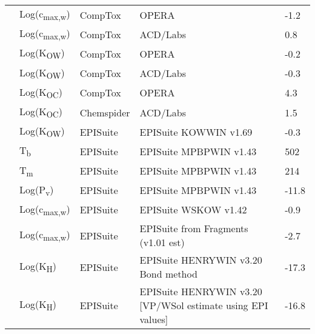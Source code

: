 \begin{landscape}
\begin{longtable}[c]{lllll}
          & Log(c\textsubscript{max,w}) & CompTox    & OPERA                                                                           & -1.2  \\
          & Log(c\textsubscript{max,w}) & CompTox    & ACD/Labs                                                                        & 0.8   \\
          & Log(K\textsubscript{OW})      & CompTox    & OPERA                                                                           & -0.2  \\
          & Log(K\textsubscript{OW})      & CompTox    & ACD/Labs                                                                        & -0.3  \\
          & Log(K\textsubscript{OC})      & CompTox    & OPERA                                                                           & 4.3   \\
          & Log(K\textsubscript{OC})      & Chemspider & ACD/Labs                                                                        & 1.5   \\
          & Log(K\textsubscript{OW})      & EPISuite   & EPISuite KOWWIN v1.69                                                           & -0.3  \\
          & T\textsubscript{b}          & EPISuite   & EPISuite MPBPWIN v1.43                                                          & 502   \\
          & T\textsubscript{m}          & EPISuite   & EPISuite MPBPWIN v1.43                                                          & 214   \\
          & Log(P\textsubscript{v})       & EPISuite   & EPISuite MPBPWIN v1.43                                                          & -11.8 \\
          & Log(c\textsubscript{max,w}) & EPISuite   & EPISuite WSKOW v1.42                                                            & -0.9  \\
          & Log(c\textsubscript{max,w}) & EPISuite   & EPISuite from Fragments (v1.01 est)                                             & -2.7  \\
          & Log(K\textsubscript{H})       & EPISuite   & EPISuite HENRYWIN v3.20 Bond method                                             & -17.3 \\
          & Log(K\textsubscript{H})       & EPISuite   & EPISuite HENRYWIN v3.20 [VP/WSol estimate using EPI values]                     & -16.8 \\

\end{longtable}
\end{landscape}
